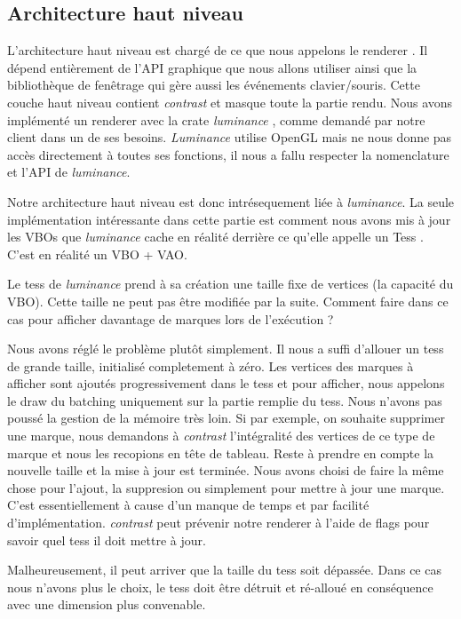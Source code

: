 \documentclass[12pt]{article}
\begin{document}
\subsection{Architecture haut niveau}

L'architecture haut niveau est chargé de ce que nous appelons le \og renderer \fg{}. Il dépend entièrement de l'API graphique que nous allons utiliser ainsi que la bibliothèque
de fenêtrage qui gère aussi les événements clavier/souris. Cette couche haut niveau contient \textit{contrast} et masque toute la partie rendu.
Nous avons implémenté un renderer avec la crate \textit{luminance} \cite{luminance}, comme demandé par notre client dans un de ses besoins.
\textit{Luminance} utilise OpenGL mais ne nous donne pas accès directement à toutes ses fonctions, il nous a fallu respecter la nomenclature et l'API de \textit{luminance}.

Notre architecture haut niveau est donc intrésequement liée à \textit{luminance}. La seule implémentation intéressante dans cette partie est comment nous avons mis à jour les VBOs que \textit{luminance} cache
en réalité derrière ce qu'elle appelle un \og Tess \fg{}. C'est en réalité un VBO + VAO.

Le tess de \textit{luminance} prend à sa création une taille fixe de vertices (la capacité du VBO). Cette taille ne peut pas être modifiée par la suite. Comment faire dans ce cas pour afficher davantage
de marques lors de l'exécution ?

Nous avons réglé le problème plutôt simplement. Il nous a suffi d'allouer un tess de grande taille, initialisé completement à zéro. Les vertices des marques à afficher sont ajoutés
progressivement dans le tess et pour afficher, nous appelons le \og draw \fg{} du batching uniquement sur la partie remplie du tess. Nous n'avons pas poussé la gestion de la mémoire très loin.
Si par exemple, on souhaite supprimer une marque, nous demandons à \textit{contrast} l'intégralité des vertices de ce type de marque et nous les recopions en tête de tableau. Reste à prendre en compte la
nouvelle taille et la mise à jour est terminée. Nous avons choisi de faire la même chose pour l'ajout, la suppresion ou simplement pour mettre à jour une marque. C'est essentiellement à cause d'un
manque de temps et par facilité d'implémentation. \textit{contrast} peut prévenir notre renderer à l'aide de flags pour savoir quel tess il doit mettre à jour.

Malheureusement, il peut arriver que la taille du tess soit dépassée. Dans ce cas nous n'avons plus le choix, le tess doit être détruit et ré-alloué en conséquence avec une dimension plus convenable.
\end{document}
